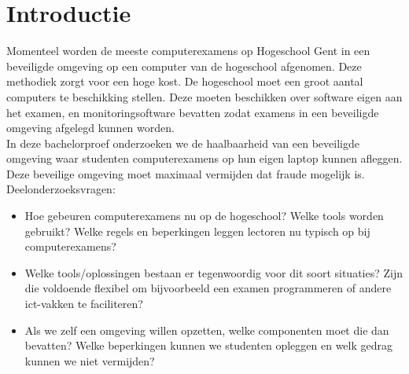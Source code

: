 
\section{Introductie} %
\label{sec:introductie}

 Momenteel worden de meeste computerexamens op Hogeschool Gent in een beveiligde omgeving op een computer van de hogeschool afgenomen. Deze methodiek zorgt voor een hoge kost. De hogeschool moet een groot aantal computers te beschikking stellen. Deze moeten beschikken over software eigen aan het examen, en monitoringsoftware bevatten zodat examens in een beveiligde omgeving afgelegd kunnen worden. \\ In deze bachelorproef onderzoeken we de haalbaarheid van een beveiligde omgeving waar studenten computerexamens op hun eigen laptop kunnen afleggen. Deze beveilige omgeving moet maximaal vermijden dat fraude mogelijk is. \\

Deelonderzoeksvragen:
  \begin{itemize}
     \item Hoe gebeuren computerexamens nu op de hogeschool? Welke tools worden gebruikt? Welke regels en beperkingen leggen lectoren nu typisch op bij computerexamens?
     
     \item Welke tools/oplossingen bestaan er tegenwoordig voor dit soort situaties? Zijn die voldoende flexibel om bijvoorbeeld een examen programmeren of andere ict-vakken te faciliteren?
     
     \item Als we zelf een omgeving willen opzetten, welke componenten moet die dan bevatten? Welke beperkingen kunnen we studenten opleggen en welk gedrag kunnen we niet vermijden?
  \end{itemize}


